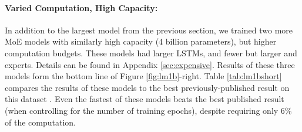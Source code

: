 \documentclass{article} %
\begin{document}
\begin{table}[!htbp]
\caption{ Summary of high-capacity MoE-augmented models with varying computational budgets, vs. best previously published results \citep{RafalNoam16}.  Details in Appendix \ref{sec:appendixlm1b}.}
\label{tab:lm1bshort}
\begin{center}
\setlength\tabcolsep{3pt}
\end{center}
\end{table}

\paragraph{Varied Computation, High Capacity:}  In addition to the largest model from the previous section, we trained two more MoE models with similarly high capacity (4 billion parameters), but higher computation budgets.  These models had larger LSTMs, and fewer but larger and experts.  Details can be found in Appendix \ref{sec:expensive}.  Results of these three models form the bottom line of Figure \ref{fig:lm1b}-right.  Table \ref{tab:lm1bshort} compares the results of these models to the best previously-published result on this dataset .  Even the fastest of these models beats the best published result (when controlling for the number of training epochs), despite requiring only 6\% of the computation.  
\end{document}
